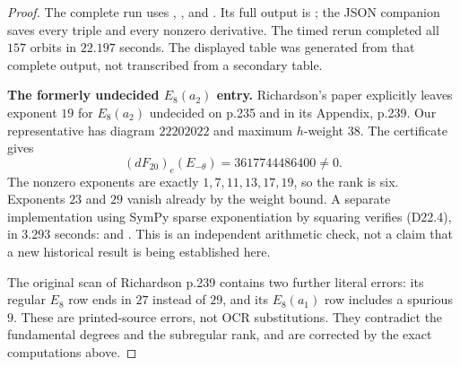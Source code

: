 \begin{proof}
The complete run uses
,
, and
.
Its full output is
;
the JSON companion saves every triple and every nonzero derivative.
The timed rerun completed all $157$ orbits in $22.197$ seconds.
The displayed table was generated from that complete output, not
transcribed from a secondary table.

\par\medskip\noindent\textbf{The formerly undecided $E_8(a_2)$ entry.}\quad
Richardson's paper explicitly leaves exponent $19$ for $E_8(a_2)$
undecided on p.235 and in its Appendix, p.239.
Our representative has diagram $22202022$ and maximum $h$-weight
$38$.  The certificate gives
\[
 (dF_{20})_e(E_{-\theta})=3617744486400\ne0.              \tag{D22.4}
\]
The nonzero exponents are exactly $1,7,11,13,17,19$, so the rank
is six.  Exponents $23$ and $29$ vanish already by the weight bound.
A separate implementation using SymPy sparse exponentiation by
squaring verifies (D22.4), in $3.293$ seconds:
 and
.
This is an independent arithmetic check, not a claim that a new
historical result is being established here.

The original scan of Richardson p.239 contains two further literal
errors: its regular $E_8$ row ends in $27$ instead of $29$, and
its $E_8(a_1)$ row includes a spurious $9$.
These are printed-source errors, not OCR substitutions.  They
contradict the fundamental degrees and the subregular rank, and
are corrected by the exact computations above.
\end{proof}

